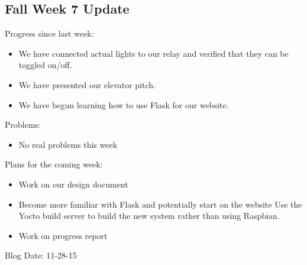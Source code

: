\subsection{Fall Week 7 Update}
Progress since last week:
\begin{itemize}
   \item We have connected actual lights to our relay and verified that they can be toggled on/off.
   \item We have presented our elevator pitch.
   \item We have begun learning how to use Flask for our website.
\end{itemize}
Problems:
\begin{itemize}
   \item No real problems this week
\end{itemize}
Plans for the coming week:
\begin{itemize}
   \item Work on our design document​
   \item Become more familiar with Flask and potentially start on the website
      Use the Yocto build server to build the new system rather than using Raspbian.
   \item Work on progress report
\end{itemize}
Blog Date: 11-28-15


